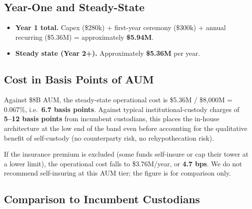 \subsection{Year-One and Steady-State}

\begin{itemize}[nosep]
\item \textbf{Year 1 total.} Capex (\$280k) + first-year ceremony
(\$300k) + annual recurring (\$5.36M) = approximately \textbf{\$5.94M}.
\item \textbf{Steady state (Year 2+).} Approximately \textbf{\$5.36M}
per year.
\end{itemize}

\subsection{Cost in Basis Points of AUM}

Against \$8B AUM, the steady-state operational cost is \$5.36M /
\$8{,}000M = 0.067\%, i.e.\ \textbf{6.7 basis points}. Against
typical institutional-custody charges of \textbf{5--12 basis points}
from incumbent custodians, this places the in-house architecture at
the low end of the band even before accounting for the qualitative
benefit of self-custody (no counterparty risk, no rehypothecation
risk).

If the insurance premium is excluded (some funds self-insure or
cap their tower at a lower limit), the operational cost falls to
\$3.76M/year, or \textbf{4.7 bps}. We do not recommend self-insuring
at this AUM tier; the figure is for comparison only.

\subsection{Comparison to Incumbent Custodians}


